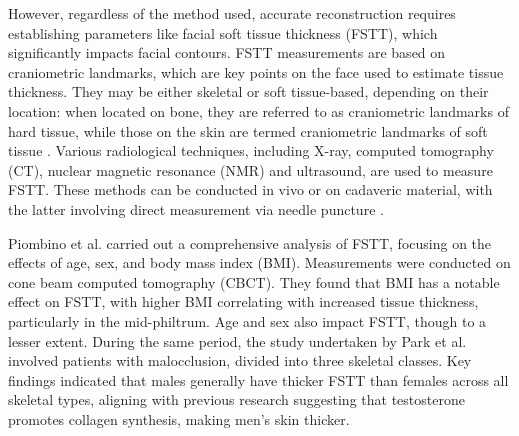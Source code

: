 \documentclass[journal,article,submit,pdftex,moreauthors]{Definitions/mdpi}
\begin{document}
However, regardless of the method used, accurate reconstruction requires establishing parameters like facial soft tissue thickness (FSTT), which significantly impacts facial contours. %
FSTT measurements are based on craniometric landmarks, which are key points on the face used to estimate tissue thickness. They may be either skeletal or soft tissue-based, depending on their location: %
 when located on bone, they are referred to as craniometric landmarks of hard tissue, while those on the skin are termed craniometric landmarks of soft tissue \citep{ref4,ref7,ref12}. %
 Various radiological techniques, including X-ray, computed tomography (CT), nuclear magnetic resonance (NMR) and ultrasound, are used to measure FSTT. These methods can be conducted in vivo or on cadaveric material, with the latter involving direct measurement via needle puncture \citep{ref13,ref14,ref15,ref16,ref17,ref18}.
 
Piombino et al. \cite{ref19} carried out a comprehensive analysis of FSTT, focusing on the effects of age, sex, and body mass index (BMI). Measurements were conducted on cone beam computed tomography (CBCT). %
They found that BMI has a notable effect on FSTT, with higher BMI correlating with increased tissue thickness, particularly in the mid-philtrum. Age and sex also impact FSTT, though to a lesser extent. During the same period, the study undertaken by Park et al. \cite{ref2} involved patients with malocclusion, divided into three skeletal classes. %
Key findings indicated that males generally have thicker FSTT than females across all skeletal types, aligning with previous research suggesting that testosterone promotes collagen synthesis, making men’s skin thicker.
\end{document}
